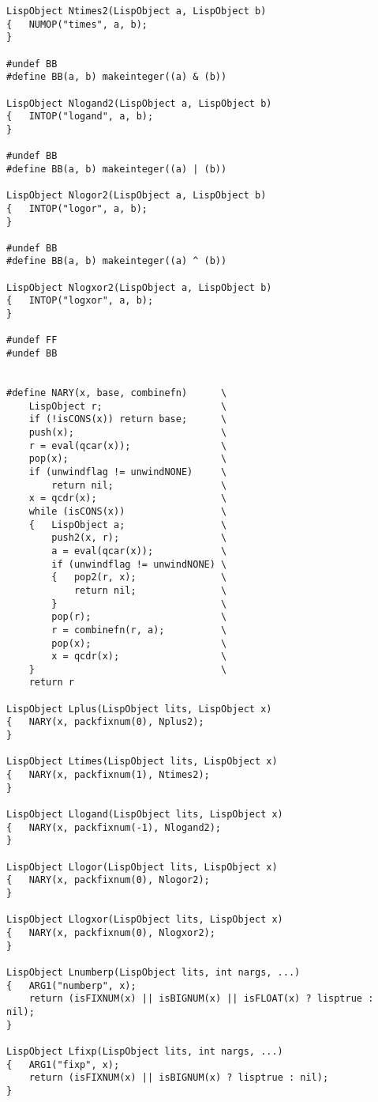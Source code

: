 {\begin{verbatim}
LispObject Ntimes2(LispObject a, LispObject b)
{   NUMOP("times", a, b);
}

#undef BB
#define BB(a, b) makeinteger((a) & (b))

LispObject Nlogand2(LispObject a, LispObject b)
{   INTOP("logand", a, b);
}

#undef BB
#define BB(a, b) makeinteger((a) | (b))

LispObject Nlogor2(LispObject a, LispObject b)
{   INTOP("logor", a, b);
}

#undef BB
#define BB(a, b) makeinteger((a) ^ (b))

LispObject Nlogxor2(LispObject a, LispObject b)
{   INTOP("logxor", a, b);
}

#undef FF
#undef BB


#define NARY(x, base, combinefn)      \
    LispObject r;                     \
    if (!isCONS(x)) return base;      \
    push(x);                          \
    r = eval(qcar(x));                \
    pop(x);                           \
    if (unwindflag != unwindNONE)     \
        return nil;                   \
    x = qcdr(x);                      \
    while (isCONS(x))                 \
    {   LispObject a;                 \
        push2(x, r);                  \
        a = eval(qcar(x));            \
        if (unwindflag != unwindNONE) \
        {   pop2(r, x);               \
            return nil;               \
        }                             \
        pop(r);                       \
        r = combinefn(r, a);          \
        pop(x);                       \
        x = qcdr(x);                  \
    }                                 \
    return r

LispObject Lplus(LispObject lits, LispObject x)
{   NARY(x, packfixnum(0), Nplus2);
}

LispObject Ltimes(LispObject lits, LispObject x)
{   NARY(x, packfixnum(1), Ntimes2);
}

LispObject Llogand(LispObject lits, LispObject x)
{   NARY(x, packfixnum(-1), Nlogand2);
}

LispObject Llogor(LispObject lits, LispObject x)
{   NARY(x, packfixnum(0), Nlogor2);
}

LispObject Llogxor(LispObject lits, LispObject x)
{   NARY(x, packfixnum(0), Nlogxor2);
}

LispObject Lnumberp(LispObject lits, int nargs, ...)
{   ARG1("numberp", x);
    return (isFIXNUM(x) || isBIGNUM(x) || isFLOAT(x) ? lisptrue : nil);
}

LispObject Lfixp(LispObject lits, int nargs, ...)
{   ARG1("fixp", x);
    return (isFIXNUM(x) || isBIGNUM(x) ? lisptrue : nil);
}


\end{verbatim}}
